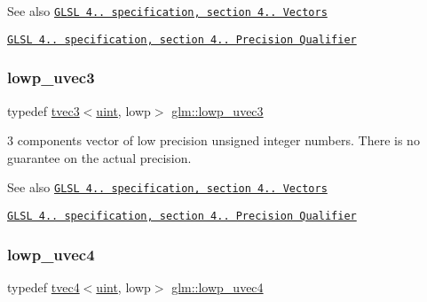 \begin{DoxySeeAlso}{See also}
\href{http://www.opengl.org/registry/doc/GLSLangSpec.4.20.8.pdf}{\tt G\+L\+SL 4.. specification, section 4.. Vectors} 

\href{http://www.opengl.org/registry/doc/GLSLangSpec.4.20.8.pdf}{\tt G\+L\+SL 4.. specification, section 4.. Precision Qualifier} 
\end{DoxySeeAlso}
\mbox{\label{group__core__precision_gab6f49c51783c774550f5217aecabd1d9}} 
\subsubsection{\texorpdfstring{lowp\+\_\+uvec3}{lowp\_uvec3}}
{\footnotesize\ttfamily typedef \hyperlink{structglm_1_1tvec3}{tvec3}$<$\hyperlink{group__core__precision_ga4fd29415871152bfb5abd588334147c8}{uint}, lowp$>$ \hyperlink{group__core__precision_gab6f49c51783c774550f5217aecabd1d9}{glm\+::lowp\+\_\+uvec3}}

3 components vector of low precision unsigned integer numbers. There is no guarantee on the actual precision.

\begin{DoxySeeAlso}{See also}
\href{http://www.opengl.org/registry/doc/GLSLangSpec.4.20.8.pdf}{\tt G\+L\+SL 4.. specification, section 4.. Vectors} 

\href{http://www.opengl.org/registry/doc/GLSLangSpec.4.20.8.pdf}{\tt G\+L\+SL 4.. specification, section 4.. Precision Qualifier} 
\end{DoxySeeAlso}
\mbox{\label{group__core__precision_ga5bb34ee8aba0f936bc521850819fc762}} 
\subsubsection{\texorpdfstring{lowp\+\_\+uvec4}{lowp\_uvec4}}
{\footnotesize\ttfamily typedef \hyperlink{structglm_1_1tvec4}{tvec4}$<$\hyperlink{group__core__precision_ga4fd29415871152bfb5abd588334147c8}{uint}, lowp$>$ \hyperlink{group__core__precision_ga5bb34ee8aba0f936bc521850819fc762}{glm\+::lowp\+\_\+uvec4}}

